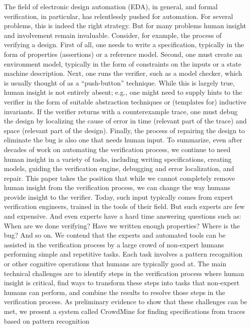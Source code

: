 The field of electronic design automation (EDA), in general, and
formal verification, in particular, has relentlessly pushed for automation.
For several problems, this is indeed the right strategy.
But for many problems human insight and involvement remain invaluable.
Consider, for example, the process of verifying a design.
First of all, one needs to write a specification, typically in the form
of properties (assertions) or a reference model. Second, one must
create an environment model, typically in the form of constraints
on the inputs or a state machine description. Next, one runs the
verifier, such as a model checker, which is usually thought of as a
“push-button” technique. While this is largely true, human insight
is not entirely absent; e.g., one might need to supply hints to the
verifier in the form of suitable abstraction techniques or (templates
for) inductive invariants. If the verifier returns with a counterexample
trace, one must debug the design by localizing the cause of
error in time (relevant part of the trace) and space (relevant part of
the design). Finally, the process of repairing the design to eliminate
the bug is also one that needs human input. To summarize, even
after decades of work on automating the verification process, we
continue to need human insight in a variety of tasks, including writing
specifications, creating models, guiding the verification engine,
debugging and error localization, and repair.
This paper takes the position that while we cannot completely
remove human insight from the verification process, we can change
the way humans provide insight to the verifier. Today, such input
typically comes from expert verification engineers, trained in the
tools of their field. But such experts are few and expensive. And
even experts have a hard time answering questions such as: When
are we done verifying? Have we written enough properties? Where
is the bug? And so on. We contend that the experts and automated
tools can be assisted in the verification process by a large crowd
of non-expert humans performing simple and repetitive tasks. Each
task involves a pattern recognition or other cognitive operations that
humans are typically good at. The main technical challenges are
to identify steps in the verification process where human insight is
critical, find ways to transform these steps into tasks that non-expert
humans can perform, and combine the results to resolve those steps
in the verification process. As preliminary evidence to show that
these challenges can be met, we present a system called CrowdMine
for finding specifications from traces based on pattern recognition

